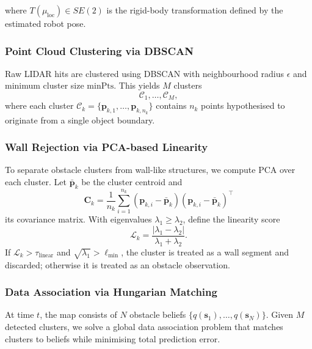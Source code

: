\documentclass[a4paper, twoside]{article}
\begin{document}
where $T(\mu_{\text{loc}})\in SE(2)$ is the rigid-body transformation defined by
the estimated robot pose.


\subsubsection{Point Cloud Clustering via DBSCAN}
\label{sec:obstacle-dbscan}

Raw LIDAR hits are clustered using DBSCAN with neighbourhood radius $\epsilon$ and minimum
cluster size $\mathrm{minPts}$. This yields $M$ clusters
\begin{equation}
\mathcal{C}_1,\ldots,\mathcal{C}_M,
\end{equation}
where each cluster $\mathcal{C}_k=\{\mathbf{p}_{k,1},\ldots,\mathbf{p}_{k,n_k}\}$ contains
$n_k$ points hypothesised to originate from a single object boundary.

\subsubsection{Wall Rejection via PCA-based Linearity}
\label{sec:obstacle-pca}

To separate obstacle clusters from wall-like structures, we compute PCA over each cluster.
Let $\bar{\mathbf{p}}_k$ be the cluster centroid and
\begin{equation}
\mathbf{C}_k=\frac{1}{n_k}\sum_{i=1}^{n_k}(\mathbf{p}_{k,i}-\bar{\mathbf{p}}_k)(\mathbf{p}_{k,i}-\bar{\mathbf{p}}_k)^\top
\end{equation}
its covariance matrix. With eigenvalues $\lambda_1\ge \lambda_2$, define the linearity score
\begin{equation}
\mathcal{L}_k=\frac{|\lambda_1-\lambda_2|}{\lambda_1+\lambda_2}.
\end{equation}
If $\mathcal{L}_k>\tau_{\text{linear}}$ and $\sqrt{\lambda_1}>\ell_{\min}$, the cluster is treated
as a wall segment and discarded; otherwise it is treated as an obstacle observation.

\subsubsection{Data Association via Hungarian Matching}
\label{sec:obstacle-association}

At time $t$, the map consists of $N$ obstacle beliefs $\{q(\mathbf{s}_1),\ldots,q(\mathbf{s}_N)\}$.
Given $M$ detected clusters, we solve a global data association problem that matches clusters to
beliefs while minimising total prediction error.
\end{document}
